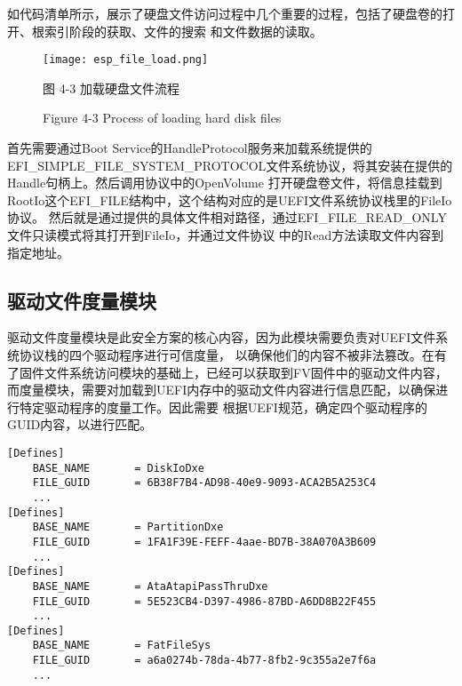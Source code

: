如代码清单所示，展示了硬盘文件访问过程中几个重要的过程，包括了硬盘卷的打开、根索引阶段的获取、文件的搜索
和文件数据的读取。

\begin{figure}[htb]
    \vspace{0cm}   
    \setlength{\abovecaptionskip}{0.3cm}
	\centering
    \texttt{[image: esp\_file\_load.png]}
    \caption*{图 4-3 加载硬盘文件流程}
    \setlength{\belowcaptionskip}{-0.7cm}
    \caption*{Figure 4-3 Process of loading hard disk files}
\end{figure}

首先需要通过Boot Service的HandleProtocol服务来加载系统提供的
EFI\_SIMPLE\_FILE\_SYSTEM\_PROTOCOL文件系统协议，将其安装在提供的Handle句柄上。然后调用协议中的OpenVolume
打开硬盘卷文件，将信息挂载到RootIo这个EFI\_FILE结构中，这个结构对应的是UEFI文件系统协议栈里的FileIo协议。
然后就是通过提供的具体文件相对路径，通过EFI\_FILE\_READ\_ONLY文件只读模式将其打开到FileIo，并通过文件协议
中的Read方法读取文件内容到指定地址。

\subsection{驱动文件度量模块}
驱动文件度量模块是此安全方案的核心内容，因为此模块需要负责对UEFI文件系统协议栈的四个驱动程序进行可信度量，
以确保他们的内容不被非法篡改。在有了固件文件系统访问模块的基础上，已经可以获取到FV固件中的驱动文件内容，
而度量模块，需要对加载到UEFI内存中的驱动文件内容进行信息匹配，以确保进行特定驱动程序的度量工作。因此需要
根据UEFI规范，确定四个驱动程序的GUID内容，以进行匹配。

\begin{lstlisting}
[Defines]
    BASE_NAME       = DiskIoDxe
    FILE_GUID       = 6B38F7B4-AD98-40e9-9093-ACA2B5A253C4
    ...
[Defines]
    BASE_NAME       = PartitionDxe
    FILE_GUID       = 1FA1F39E-FEFF-4aae-BD7B-38A070A3B609
    ...
[Defines]
    BASE_NAME       = AtaAtapiPassThruDxe
    FILE_GUID       = 5E523CB4-D397-4986-87BD-A6DD8B22F455
    ...
[Defines]
    BASE_NAME       = FatFileSys
    FILE_GUID       = a6a0274b-78da-4b77-8fb2-9c355a2e7f6a
    ...
\end{lstlisting}

